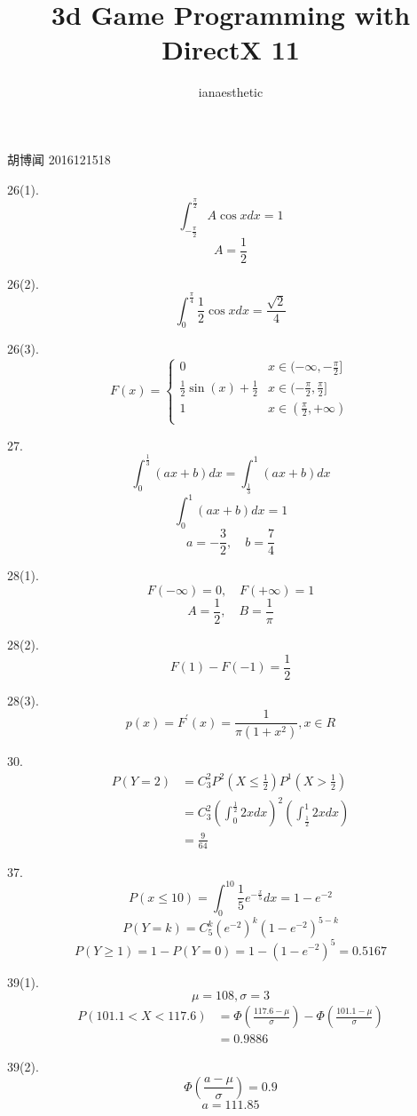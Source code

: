 \documentclass[10pt, a4paper,twocolumn]{article}
\author{ianaesthetic}
\title{3d Game Programming with DirectX 11}
\begin{document}
    胡博闻 2016121518
    \medskip

    26(1).
    $$\int_{-\frac{\pi}{2}}^{\frac{\pi}{2}} A\cos{x}dx = 1$$
    $$A  = \frac{1}{2}$$

    26(2). 
    $$\int_{0}^{\frac{\pi}{4}}\frac{1}{2}\cos{x}dx = \frac{\sqrt{2}}{4} $$

    26(3).
    $$F(x) = 
    \begin{cases}
        0 & x \in (-\infty, -\frac{\pi}{2}] \\
        \frac{1}{2}\sin(x) + \frac{1}{2} & x \in (-\frac{\pi}{2}, \frac{\pi}{2}] \\
        1 & x \in (\frac{\pi}{2}, +\infty) \\ 
    \end{cases}$$

    27.
        $$\int_{0}^{\frac{1}{3}}(ax + b)dx = \int_{\frac{1}{3}}^{1}(ax + b)dx$$
        $$\int_{0}^{1}(ax + b)dx = 1$$
        $$a = -\frac{3}{2}, \quad b = \frac{7}{4}$$

    28(1).
        $$F(-\infty) = 0, \quad F(+\infty) = 1$$
        $$A =  \frac{1}{2}, \quad B = \frac{1}{\pi}$$
    
    28(2). 
        $$F(1) - F(-1) = \frac{1}{2}$$
    
    28(3). 
        $$p(x) = F^{'}(x) = \frac{1}{\pi(1 + x^2)}, x \in R$$

    30.
        $$\begin{aligned}
            P(Y = 2) 
            &= C_{3}^{2}P^{2}(X \leqslant \frac{1}{2})P^{1}(X > \frac{1}{2}) \\
            &= C_{3}^{2}(\int_{0}^{\frac{1}{2}}2xdx)^2(\int_{\frac{1}{2}}^{1}2xdx) \\
            & = \frac{9}{64}
        \end{aligned}$$

    37.
    $$P(x \leqslant 10) = \int_{0}^{10}\frac{1}{5}e^{-\frac{x}{5}}dx = 1 - e^{-2} $$
    $$P(Y = k) = C_5^k(e^{-2})^k(1 - e^{-2})^{5 - k}$$
    $$P(Y \geqslant 1) = 1 - P(Y = 0) = 1 - (1 - e^{-2})^5 = 0.5167$$

    39(1).$$\mu = 108, \sigma = 3$$
    $$\begin{aligned}
        P(101.1 < X < 117.6) 
        &= \Phi(\frac{117.6 - \mu}{\sigma}) - \Phi(\frac{101.1 - \mu}{\sigma}) \\
        &=0.9886
    \end{aligned}$$

    39(2).
    $$\Phi(\frac{a - \mu}{\sigma}) = 0.9$$
    $$a = 111.85$$
\end{document}
